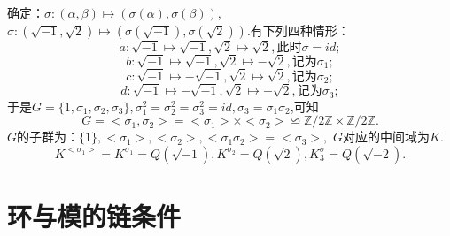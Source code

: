 \documentclass[UTF8]{article}
\begin{document}
确定：$\sigma:(\alpha,\beta)\longmapsto (\sigma(\alpha),\sigma(\beta))$,
$\sigma:(\sqrt{-1},\sqrt{2})\longmapsto (\sigma(\sqrt{-1}),\sigma(\sqrt{2}))$.有下列四种情形：
$$a:\sqrt{-1}\longmapsto\sqrt{-1},\sqrt{2}\longmapsto\sqrt{2},\text{此时}\sigma=id;$$
$$b:\sqrt{-1}\longmapsto\sqrt{-1},\sqrt{2}\longmapsto-\sqrt{2},\text{记为}\sigma_1;$$
$$c:\sqrt{-1}\longmapsto-\sqrt{-1},\sqrt{2}\longmapsto\sqrt{2},\text{记为}\sigma_2;$$
$$d:\sqrt{-1}\longmapsto-\sqrt{-1},\sqrt{2}\longmapsto-\sqrt{2},\text{记为}\sigma_3;$$
于是$G=\{1,\sigma_1,\sigma_2,\sigma_3\},\sigma_1^2=\sigma_2^2=\sigma_3^2=id,\sigma_3=\sigma_1\sigma_2$,可知
$$G=<\sigma_1,\sigma_2>=<\sigma_1>\times<\sigma_2>\backsimeq  \mathbb{Z}/2\mathbb{Z}\times \mathbb{Z}/2\mathbb{Z}.$$
$G$的子群为：$\{1\},<\sigma_1>,<\sigma_2>,<\sigma_1\sigma_2>=<\sigma_3>,$ $G$对应的中间域为$K$.\\
$$K^{<\sigma_1>}=K^{\sigma_1}=Q(\sqrt{-1}),K^{\sigma_2}=Q(\sqrt{2}),K^\sigma_3=Q(\sqrt{-2}).$$
\section{环与模的链条件}
\end{document}
